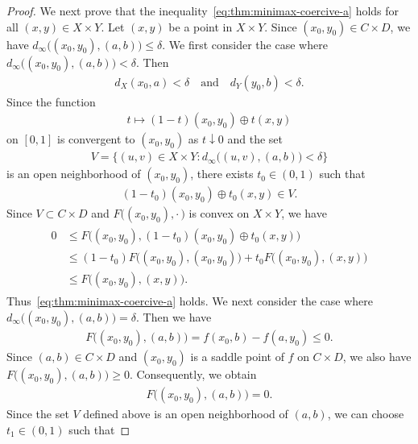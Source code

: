 \documentclass[draft]{amsart}
\numberwithin{equation}{section}
\theoremstyle{plain}
\theoremstyle{definition}
\theoremstyle{remark}
\begin{document}
\begin{proof}
 We next prove that the inequality~\eqref{eq:thm:minimax-coercive-a} holds 
 for all $(x,y) \in X\times Y$. 
 Let $(x,y)$ be a point in $X\times Y$. 
 Since $(x_0,y_0)\in C\times D$, we have 
 $d_{\infty} \bigl((x_0,y_0), (a,b)\bigr) \leq \delta$.  
 We first consider the case where $d_{\infty}\bigl((x_0,y_0), (a,b)\bigr)<\delta$. 
 Then 
 \begin{align}
  d_X(x_0,a)<\delta\quad \textrm{and} \quad d_Y(y_0,b)<\delta. 
 \end{align}
 \fi
 Since the function 
 \begin{align}
  t\mapsto (1-t) (x_0,y_0) \oplus t (x,y)
 \end{align}
 on $[0,1]$ is convergent to $(x_0,y_0)$ as $t\downarrow 0$ and 
 the set 
 \begin{align}
  V=\bigl\{(u,v)\in X\times Y: 
  d_{\infty} \bigl((u,v), (a,b)\bigr) < \delta
 \bigr\}
 \end{align}
 is an open neighborhood of $(x_0,y_0)$, 
 there exists $t_0\in (0,1)$ such that 
 \begin{align}
  (1-t_0) (x_0,y_0) \oplus t_0 (x,y) 
  \in V. 
 \end{align}
 Since $V\subset C\times D$ and $F\bigl((x_0,y_0),\cdot\,\bigr)$ is convex 
 on $X\times Y$, we have 
 \begin{align}
 \begin{split}
   0 
  &\leq F\bigl((x_0,y_0), (1-t_0) (x_0,y_0) \oplus t_0 (x,y) \bigr) \\
  &\leq (1-t_0) F\bigl((x_0,y_0), (x_0,y_0)\bigr) 
 +t_0 F\bigl((x_0,y_0), (x,y)\bigr) \\
  &\leq F\bigl((x_0,y_0), (x,y) \bigr).   
 \end{split}
 \end{align}
 Thus~\eqref{eq:thm:minimax-coercive-a} holds. 
 We next consider the case where 
 $d_{\infty}\bigl((x_0,y_0), (a,b)\bigr)=\delta$.  
 Then we have 
 \begin{align}
  F\bigl((x_0,y_0), (a,b)\bigr)
  =f(x_0,b) - f(a, y_0) \leq 0. 
 \end{align}
 Since $(a,b)\in C\times D$ and $(x_0,y_0)$ 
 is a saddle point of $f$ on $C\times D$, 
 we also have 
  $F\bigl((x_0,y_0), (a,b)\bigr) \geq 0$. 
 Consequently, we obtain 
 \begin{align}
  F\bigl((x_0,y_0), (a,b)\bigr)=0. 
 \end{align}
 Since the set $V$ defined above is an open neighborhood of $(a,b)$, 
 we can choose $t_1\in (0,1)$ such that 

\end{proof}
\end{document}

